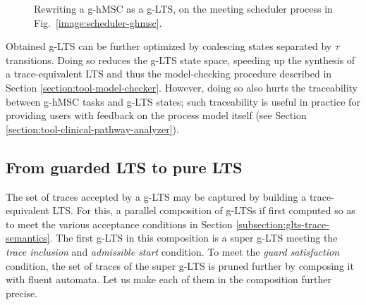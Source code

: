 \begin{figure}[H]\centering
{}
\caption{Rewriting a g-hMSC as a g-LTS, on the meeting scheduler process in Fig.~\ref{image:scheduler-ghmsc}.\label{image:scheduler-ghmsc-glts}}
\end{figure}

Obtained g-LTS can be further optimized by coalescing states separated by $\tau$ transitions. Doing so reduces the g-LTS state space, speeding up the synthesis of a trace-equivalent LTS and thus the model-checking procedure described in Section \ref{section:tool-model-checker}. However, doing so also hurts the traceability between g-hMSC tasks and g-LTS states; such traceability is useful in practice for providing users with feedback on the process model itself (see Section \ref{section:tool-clinical-pathway-analyzer}). 

\subsection{From guarded LTS to pure LTS\label{subsection:from-glts-to-lts}}

The set of traces accepted by a g-LTS may be captured by building a trace-equivalent LTS. For this, a parallel composition of g-LTSs if first computed so as to meet the various acceptance conditions in Section \ref{subsection:glts-trace-semantics}. The first g-LTS in this composition is a super g-LTS meeting the \emph{trace inclusion} and \emph{admissible start} condition. To meet the \emph{guard satisfaction} condition, the set of traces of the super g-LTS is pruned further by composing it with fluent automata. Let us make each of them in the composition further precise.

